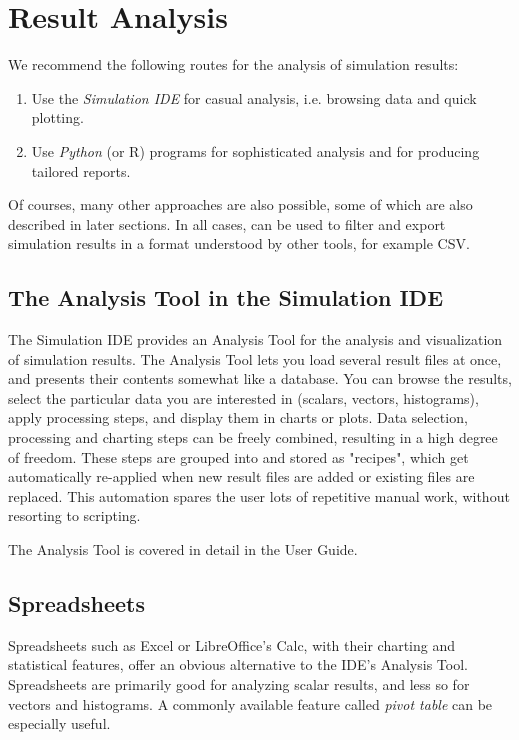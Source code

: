 \section{Result Analysis}
\label{sec:ana-sim:result-analysis}

We recommend the following routes for the analysis of simulation results:

\begin{enumerate}
  \item Use the \textit{Simulation IDE} for casual analysis, i.e. browsing data
        and quick plotting.
  \item Use \textit{Python} (or R) programs for sophisticated analysis and for
        producing tailored reports.
\end{enumerate}

Of courses, many other approaches are also possible, some of which are also
described in later sections. In all cases,  can be used to
filter and export simulation results in a format understood by other tools, for
example CSV.


\subsection{The Analysis Tool in the Simulation IDE}
\label{sec:ana-sim:analysis-tool}

The Simulation IDE provides an Analysis Tool for the analysis and visualization
of simulation results. The Analysis Tool lets you load several result files
at once, and presents their contents somewhat like a database. You can
browse the results, select the particular data you are interested in
(scalars, vectors, histograms), apply processing steps, and display them
in charts or plots. Data selection, processing and charting steps
can be freely combined, resulting in a high degree of freedom.
These steps are grouped into and stored as "recipes", which get automatically
re-applied when new result files are added or existing files are
replaced. This automation spares the user lots of repetitive manual work,
without resorting to scripting.

The Analysis Tool is covered in detail in the User Guide.


\subsection{Spreadsheets}
\label{sec:ana-sim:spreadsheet-programs}

Spreadsheets such as Excel or LibreOffice's Calc, with their charting and
statistical features, offer an obvious alternative to the IDE's Analysis Tool.
Spreadsheets are primarily good for analyzing scalar results, and less so for
vectors and histograms. A commonly available feature called \textit{pivot table}
can be especially useful.

